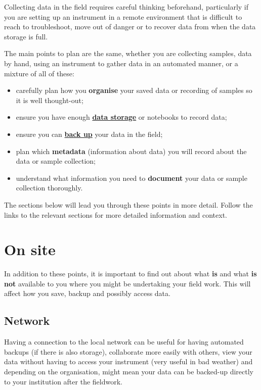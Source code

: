 \documentclass[a4paper,oneside]{report}
\providecommand{\tightlist}{%
  \setlength{\itemsep}{0pt}\setlength{\parskip}{0pt}}
\begin{document}
Collecting data in the field requires careful thinking beforehand,
particularly if you are setting up an instrument in a remote environment
that is difficult to reach to troubleshoot, move out of danger or to
recover data from when the data storage is full.

The main points to plan are the same, whether you are collecting
samples, data by hand, using an instrument to gather data in an
automated manner, or a mixture of all of these:

\begin{itemize}
\tightlist
\item
  carefully plan how you \textbf{organise} your saved data or recording
  of samples so it is well thought-out;
\item
  ensure you have enough \textbf{\protect\hyperlink{storing-data}{data
  storage}} or notebooks to record data;
\item
  ensure you can \textbf{\protect\hyperlink{backing-up-data}{back up}}
  your data in the field;
\item
  plan which \textbf{metadata} (information about data) you will record
  about the data or sample collection;
\item
  understand what information you need to \textbf{document} your data or
  sample collection thoroughly.
\end{itemize}

The sections below will lead you through these points in more detail.
Follow the links to the relevant sections for more detailed information
and context.

\hypertarget{on-site}{%
\section{On site}\label{on-site}}

In addition to these points, it is important to find out about what
\textbf{is} and what \textbf{is not} available to you where you might be
undertaking your field work. This will affect how you save, backup and
possibly access data.

\hypertarget{network}{%
\subsection{Network}\label{network}}

Having a connection to the local network can be useful for having
automated backups (if there is also storage), collaborate more easily
with others, view your data without having to access your instrument
(very useful in bad weather) and depending on the organisation, might
mean your data can be backed-up directly to your institution after the
fieldwork.
\end{document}
